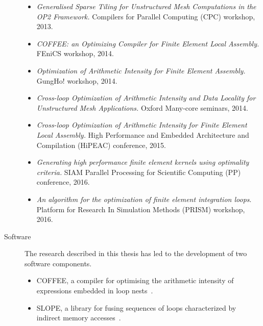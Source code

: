 \begin{description}
\begin{itemize}
\item {\em Generalised Sparse Tiling for Unstructured Mesh Computations in the OP2 Framework.} Compilers for Parallel Computing (CPC) workshop, 2013.
\item {\em COFFEE: an Optimizing Compiler for Finite Element Local Assembly.} FEniCS workshop, 2014.
\item {\em Optimization of Arithmetic Intensity for Finite Element Assembly.} GungHo! workshop, 2014.
\item {\em Cross-loop Optimization of Arithmetic Intensity and Data Locality for Unstructured Mesh Applications.} Oxford Many-core seminars, 2014.
\item {\em Cross-loop Optimization of Arithmetic Intensity for Finite Element Local Assembly.} High Performance and Embedded Architecture and Compilation (HiPEAC) conference, 2015.
\item {\em Generating high performance finite element kernels using optimality criteria.} SIAM Parallel Processing for Scientific Computing (PP) conference, 2016.
\item {\em An algorithm for the optimization of finite element integration loops}. Platform for Research In Simulation Methods (PRISM) workshop, 2016.
\end{itemize}

\item[Software] The research described in this thesis has led to the development of two software components.
\begin{itemize}
\item COFFEE, a compiler for optimising the arithmetic intensity of expressions embedded in loop nests~\citep{coffee-code}.
\item SLOPE, a library for fusing sequences of loops characterized by indirect memory accesses~\citep{slope-code}.
\end{itemize}
\end{description}



